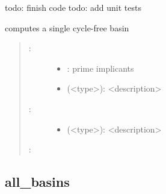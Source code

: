 \documentclass[letterpaper,10pt,english]{sphinxmanual}
\begin{document}
\begin{fulllineitems}
\label{\detokenize{Basins:PyBoolNet.Basins.cycfree_basin}}
todo: finish code
todo: add unit tests

computes a single cycle-free basin
\begin{quote}
\begin{description}
\item[{:}] \leavevmode\begin{itemize}
\item {} 
: prime implicants

\item {} 
 (\textless{}type\textgreater{}): \textless{}description\textgreater{}

\end{itemize}

\item[{:}] \leavevmode\begin{itemize}
\item {} 
 (\textless{}type\textgreater{}): \textless{}description\textgreater{}

\end{itemize}

\end{description}

:

\begin{sphinxVerbatim}[commandchars=\\\{\}]
\end{sphinxVerbatim}
\end{quote}

\end{fulllineitems}



\subsection{all\_basins}
\label{\detokenize{Basins:id4}}\label{\detokenize{Basins:all-basins}}
\end{document}
